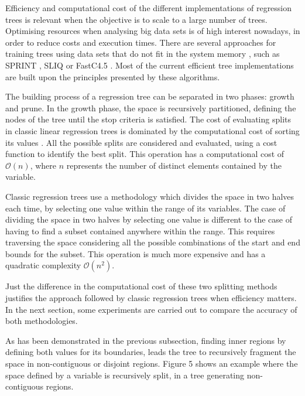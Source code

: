 \documentclass[times,twocolumn,final,authoryear]{elsarticle}
\begin{document}
Efficiency and computational cost of the different implementations of regression trees is relevant when the objective is to scale to a large number of trees. Optimising resources when analysing big data sets is of high interest nowadays, in order to reduce costs and execution times. There are several approaches for training trees using data sets that do not fit in the system memory \citep{Rokach2016}, such as SPRINT \citep{Shareretal1996}, SLIQ \citep{Mehtaetal1996} or FastC4.5 \citep{Heetal2007}. Most of the current efficient tree implementations are built upon the principles presented by these algorithms.

The building process of a regression tree can be separated in two phases: growth and prune. In the growth phase, the space is recursively partitioned, defining the nodes of the tree until the stop criteria is satisfied. The cost of evaluating splits in classic linear regression trees is dominated by the computational cost of sorting its values \citep{Shareretal1996}. All the possible splits are considered and evaluated, using a cost function to identify the best split. This operation has a computational cost of $\mathcal{O}(n)$, where $n$ represents the number of distinct elements contained by the variable.

Classic regression trees use a methodology which divides the space in two halves each time, by selecting one value within the range of its variables. The case of dividing the space in two halves by selecting one value is different to the case of having to find a subset contained anywhere within the range. This requires traversing the space considering all the possible combinations of the start and end bounds for the subset. This operation is much more expensive and has a quadratic complexity $\mathcal{O}(n^2)$.

Just the difference in the computational cost of these two splitting methods justifies the approach followed by classic regression trees when efficiency matters. In the next section, some experiments are carried out to compare the accuracy of both methodologies.

As has been demonstrated in the previous subsection, finding inner regions by defining both values for its boundaries, leads the tree to recursively fragment the space in non-contiguous or disjoint regions. Figure 5 shows an example where the space defined by a variable is recursively split, in a tree generating non-contiguous regions.

%
%
\end{document}
